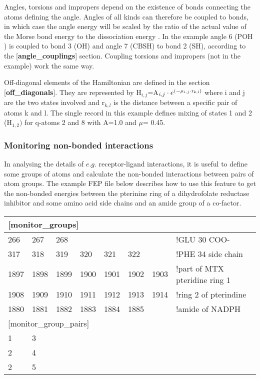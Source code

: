 \documentclass[a4paper,10pt]{article}
\begin{document}
Angles,  torsions  and impropers  depend  on  the existence  of  bonds
connecting  the atoms  defining the  angle.  Angles of  all kinds  can
therefore be coupled to bonds, in  which case the angle energy will be
scaled by the  ratio of the actual  value of the Morse  bond energy to
the dissociation  energy \cite{Aaqvist:1991}.  In the example  angle 6
(P{\-}O{\-}H  )   is  coupled   to  bond  3   (O{\-}H)  and   angle  7
(CB{\-}S{\-}H)    to   bond    2    (S{\-}H),    according   to    the
[\textbf{angle{\_}couplings}] section. Coupling torsions and impropers
(not in the example) work the same way.

Off-diagonal elements  of the Hamiltonian  are defined in  the section
[\textbf{off{\_}diagonals}].      They     are      represented     by
H$_{i,j}$=A$_{i,j}\cdot e^{(-\mu  _{i,j}\cdot \rm{r}_{k,l})}$  where i
and  j are  the  two states  involved and  r$_{k,l}$  is the  distance
between a specific  pair of atoms k  and l. The single  record in this
example defines mixing of states 1 and 2 (H$_{1,2})$ for q-atoms 2 and
8 with A=1.0 and $\mu $= 0.45.

\subsubsection{Monitoring non-bonded interactions}
In analysing the details of $e.g.$ receptor-ligand interactions, it is
useful to  define some  groups of atoms  and calculate  the non-bonded
interactions between pairs of atom  groups. The example FEP file below
describes  how to  use this  feature  to get  the non-bonded  energies
between the pterinine ring of  a dihydrofolate reductase inhibitor and
some amino acid side chains and an amide group of a co-factor.

\begin{center}
\begin{tabularx}{\textwidth}{|l l l l l l l|X|}
  \hline \multicolumn{7}{|l|}{[monitor{\_}groups]} & \\
  \hline 266  & 267  & 268  &      &      &      &      & !GLU 30 COO- \\
  \hline 317  & 318  & 319  & 320  & 321  & 322  &      & !PHE 34 side chain \\
  \hline 1897 & 1898 & 1899 & 1900 & 1901 & 1902 & 1903 & !part of MTX pteridine ring 1 \\
  \hline 1908 & 1909 & 1910 & 1911 & 1912 & 1913 & 1914 & !ring 2 of pterindine \\
  \hline 1880 & 1881 & 1882 & 1883 & 1884 & 1885 &      & !amide of NADPH \\
  \hline \multicolumn{7}{|l|}{[monitor{\_}group{\_}pairs]} & \\
  \hline 1 & 3 &&&&&&\\
  \hline 2 & 4 &&&&&&\\
  \hline 2 & 5 &&&&&&\\ \hline
\end{tabularx}
\end{center}
\end{document}
